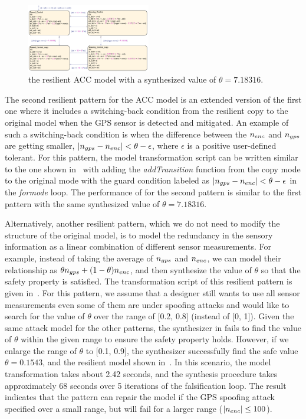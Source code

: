 \begin{figure}[t!]%
	\centering%
    \includegraphics[width=0.48\textwidth]{image/acc_model_pat1}%
	\caption{the resilient ACC model with a synthesized value of $\theta = 7.18316$.}%
\end{figure}%

The second resilient pattern for the ACC model is an extended version of the first one where it includes a switching-back condition from the resilient copy to the original model when the GPS sensor is detected and mitigated. An example of such a switching-back condition is when the difference between the $n_{enc}$ and $n_{gps}$ are getting smaller, \ie $|n_{gps} -n_{enc}| < \theta - \epsilon$, where $\epsilon$ is a positive user-defined tolerant. For this pattern, the model transformation script can be written similar to the one shown in~ with adding the \emph{addTransition} function from the copy mode to the original mode with the guard condition labeled as $|n_{gps} -n_{enc}| < \theta - \epsilon$ in the \emph{formode} loop.
%
The performance of \toolreaffirm for the second pattern is similar to the first pattern with the same synthesized value of $\theta = 7.18316$.



Alternatively, another resilient pattern, which we do not need to modify the structure of the original model, is to model the redundancy in the sensory information as a linear combination of different sensor measurements. For example, instead of taking the average of $n_{gps}$ and $n_{enc}$, we can model their relationship as $\theta n_{gps} + (1-\theta)n_{enc}$, and then synthesize the value of $\theta$ so that the safety property is satisfied. The transformation script of this resilient pattern is given in~. For this pattern, we assume that a designer still wants to use all sensor measurements even some of them are under spoofing attacks and would like to search for the value of $\theta$ over the range of [0.2, 0.8] (instead of [0, 1]). Given the same attack model for the other patterns, the synthesizer in \toolreaffirm fails to find the value of $\theta$ within the given range to ensure the safety property holds. However, if we enlarge the range of $\theta$ to [0.1, 0.9], the synthesizer successfully find the safe value $\theta = 0.1543$, and the resilient model shown in~. In this scenario, the model transformation takes about 2.42 seconds, and the synthesis procedure takes approximately 68 seconds over 5 iterations of the falsification loop.    
%
The result indicates that the pattern can repair the model if the GPS spoofing attack specified over a small range, but will fail for a larger range (\eg $|n_{enc}| \leq 100$).           

